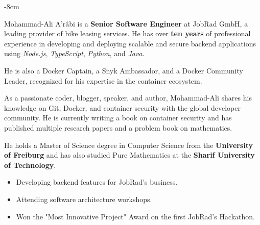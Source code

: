 \documentclass[10pt,a4paper]{altacv}
\begin{document}

\begin{adjustwidth}{}{-8cm}
\makecvheader
\end{adjustwidth}


Mohammad-Ali A'râbi is a \textbf{Senior Software Engineer} at JobRad GmbH, a leading provider of bike leasing services. He has over \textbf{ten years} of professional experience in developing and deploying scalable and secure backend applications using \emph{Node.js}, \emph{TypeScript}, \emph{Python}, and \emph{Java}. 

He is also a Docker Captain, a Snyk Ambassador, and a Docker Community Leader, recognized for his expertise in the container ecosystem. 

As a passionate coder, blogger, speaker, and author, Mohammad-Ali shares his knowledge on Git, Docker, and container security with the global developer community. He is currently writing a book on container security and has published multiple research papers and a problem book on mathematics. 

He holds a Master of Science degree in Computer Science from the \textbf{University of Freiburg} and has also studied Pure Mathematics at the \textbf{Sharif University of Technology}.




\begin{itemize}
    \item Developing backend features for JobRad's business.
    \item Attending software architecture workshops.
    \item Won the "Most Innovative Project" Award on the first JobRad's Hackathon.
\end{itemize}
\end{document}
